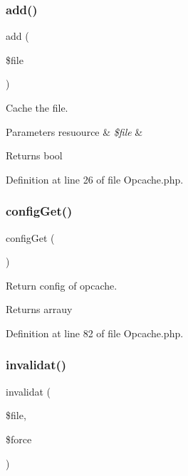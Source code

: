 \subsubsection{\texorpdfstring{add()}{add()}}
{\footnotesize\ttfamily add (\begin{DoxyParamCaption}\item[{}]{\$file }\end{DoxyParamCaption})}

Cache the file.


\begin{DoxyParams}[1]{Parameters}
resuource & {\em \$file} & \\
\hline
\end{DoxyParams}
\begin{DoxyReturn}{Returns}
bool 
\end{DoxyReturn}


Definition at line 26 of file Opcache.\+php.

\mbox{\label{class_zest_1_1_cache_1_1_opcache_1_1_opcache_a9d1798b16db43d2ef1a36b9d3ce27731}} 
\subsubsection{\texorpdfstring{config\+Get()}{configGet()}}
{\footnotesize\ttfamily config\+Get (\begin{DoxyParamCaption}{ }\end{DoxyParamCaption})}

Return config of opcache.

\begin{DoxyReturn}{Returns}
arrauy 
\end{DoxyReturn}


Definition at line 82 of file Opcache.\+php.

\mbox{\label{class_zest_1_1_cache_1_1_opcache_1_1_opcache_a54488782e0aac9baf864c137182108e0}} 
\subsubsection{\texorpdfstring{invalidat()}{invalidat()}}
{\footnotesize\ttfamily invalidat (\begin{DoxyParamCaption}\item[{}]{\$file,  }\item[{}]{\$force }\end{DoxyParamCaption})}

